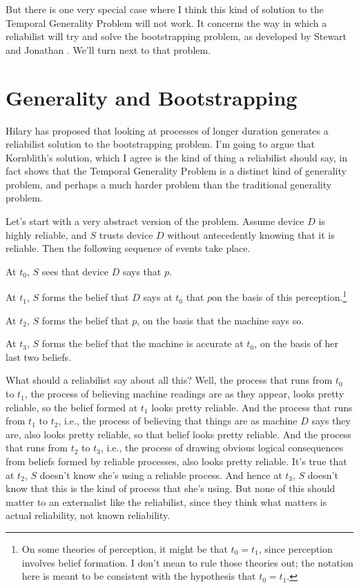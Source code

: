 \documentclass[11pt,oneside]{book}
\begin{document}
But there is one very special case where I think this kind of solution to the Temporal Generality Problem will not work. It concerns the way in which a reliabilist will try and solve the bootstrapping problem, as developed by Stewart \cite{Cohen2002} and Jonathan \cite{Vogel2000}. We'll turn next to that problem.

\section{Generality and Bootstrapping}

Hilary \cite{Kornblith2009} has proposed that looking at processes of longer duration generates a reliabilist solution to the bootstrapping problem. I'm going to argue that Kornblith's solution, which I agree is the kind of thing a reliabilist should say, in fact shows that the Temporal Generality Problem is a distinct kind of generality problem, and perhaps a much harder problem than the traditional generality problem.

Let's start with a very abstract version of the problem. Assume device $D$ is highly reliable, and $S$ trusts device $D$ without antecedently knowing that it is reliable. Then the following sequence of events take place.

\begin{itemize*}
\item At $t_0$, $S$ sees that device $D$ says that $p$.
\item At $t_1$, $S$ forms the belief that $D$ says at $t_0$ that $p$on the basis of this perception.\footnote{On some theories of perception, it might be that $t_0 = t_1$, since perception involves belief formation. I don't mean to rule those theories out; the notation here is meant to be consistent with the hypothesis that $t_0 = t_1$.}
\item At $t_2$, $S$ forms the belief that $p$, on the basis that the machine says so.
\item At $t_3$, $S$ forms the belief that the machine is accurate at $t_0$, on the basis of her last two beliefs.
\end{itemize*}

\noindent What should a reliabilist say about all this? Well, the process that runs from $t_0$ to $t_1$, the process of believing machine readings are as they appear, looks pretty reliable, so the belief formed at $t_1$ looks pretty reliable. And the process that runs from $t_1$ to $t_2$, i.e., the process of believing that things are as machine $D$ says they are, also looks pretty reliable, so that belief looks pretty reliable. And the process that runs from $t_2$ to $t_3$, i.e., the process of drawing obvious logical consequences from beliefs formed by reliable processes, also looks pretty reliable. It's true that at $t_2$, $S$ doesn't know she's using a reliable process. And hence at $t_3$, $S$ doesn't know that this is the kind of process that she's using. But none of this should matter to an externalist like the reliabilist, since they think what matters is actual reliability, not known reliability.
\end{document}

